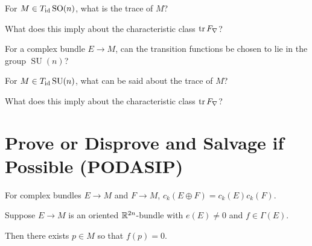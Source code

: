 \documentclass{homework}
\DeclareMathOperator{\SU}{SU}
\begin{document}
\begin{problem}
  For $M \in T_{\operatorname{id}} \operatorname{SO}(n)$, what is the trace of $M$?

  What does this imply about the characteristic class $\operatorname{tr} F_\nabla$?
\end{problem}

\begin{problem}
 For a complex bundle $E \to M$, can the transition functions be chosen to lie in the group $\SU(n)$?  
\end{problem}

\begin{problem}
  For $M \in T_{\id} \SU(n)$, what can be said about the trace of $M$?

  What does this imply about the characteristic class $\operatorname{tr} F_\nabla$?
\end{problem}

\section{Prove or Disprove and Salvage if Possible (PODASIP)}

\begin{problem}
  For complex bundles $E \to M$ and $F \to M$, 
    $c_k(E \oplus F) = c_k(E) c_k(F)$.
\end{problem}

\begin{problem}
  Suppose $E \to M$ is an oriented $\mathbb{R}^{2n}$-bundle with $e(E) \neq 0$ and $f \in \Gamma(E)$.

  Then there exists $p \in M$ so that $f(p) = 0$.
\end{problem}
\end{document}
